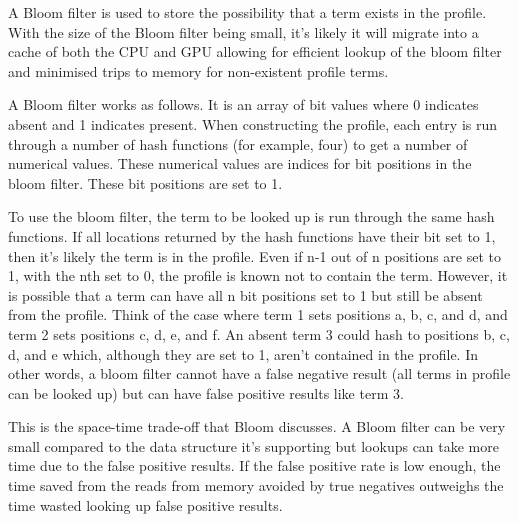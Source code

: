 A Bloom filter is used to store the possibility that a term exists in the
profile. With the size of the Bloom filter being small, it's likely it will
migrate into a cache of both the CPU and GPU allowing for efficient lookup of
the bloom filter and minimised trips to memory for non-existent profile terms.

A Bloom filter works as follows. It is an array of bit values where 0 indicates
absent and 1 indicates present. When constructing the profile, each entry is
run through a number of hash functions (for example, four) to get a number of
numerical values. These numerical values are indices for bit positions in the
bloom filter. These bit positions are set to 1.

To use the bloom filter, the term to be looked up is run through the same hash
functions. If all locations returned by the hash functions have their bit set to
1, then it's likely the term is in the profile. Even if n-1 out of n positions
are set to 1, with the nth set to 0, the profile is known not to contain the
term. However, it is possible that a term can have all n bit positions set to 1
but still be absent from the profile. Think of the case where term 1 sets
positions a, b, c, and d, and term 2 sets positions c, d, e, and f. An absent
term 3 could hash to positions b, c, d, and e which, although they are set to 1,
aren't contained in the profile. In other words, a bloom filter cannot have a
false negative result (all terms in profile can be looked up) but can have false
positive results like term 3.

This is the space-time trade-off that Bloom discusses. A Bloom filter can be
very small compared to the data structure it's supporting but lookups can take
more time due to the false positive results. If the false positive rate is low
enough, the time saved from the reads from memory avoided by true negatives
outweighs the time wasted looking up false positive results.
